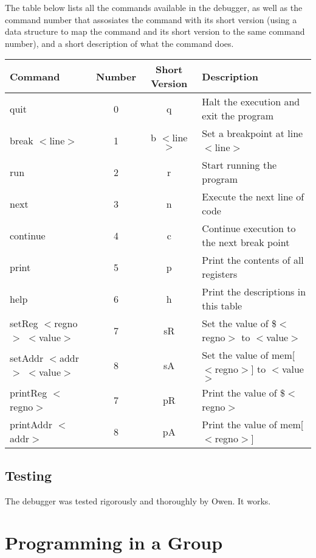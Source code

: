 \documentclass[11pt]{report}
\begin{document}
The table below lists all the commands available in the debugger, as well as the 
command number that assosiates the command with its short version (using a data 
structure to map the command and its short version to the same command number), 
and a short description of what the command does.
\begin{center}
	\begin{tabular}{ | l | c | c | p{5cm} |}
	\hline
	Command & Number & Short Version & Description \\ \hline
	quit & 0 & q & Halt the execution and exit the program \\ \hline
	break $<$line$>$ & 1 & b $<$line$>$ & Set a breakpoint at line $<$line$>$ \\ \hline
	run & 2 & r & Start running the program \\ \hline
	next & 3 & n & Execute the next line of code \\ \hline
	continue & 4 & c & Continue execution to the next break point \\ \hline
	print & 5 & p & Print the contents of all registers \\ \hline
	help & 6 & h & Print the descriptions in this table \\ \hline
	setReg $<$regno$>$ $<$value$>$ & 7 & sR & Set the value of \$$<$regno$>$ to $<$value$>$ \\ \hline
	setAddr $<$addr$>$ $<$value$>$ & 8 & sA & Set the value of mem[$<$regno$>$] to $<$value$>$ \\ \hline
	printReg $<$regno$>$ & 7 & pR & Print the value of \$$<$regno$>$ \\ \hline
	printAddr $<$addr$>$ & 8 & pA & Print the value of mem[$<$regno$>$] \\ \hline
	\end{tabular}
\end{center}

\subsection*{Testing}

The debugger was tested rigorously and thoroughly by Owen. It works.

\section*{Programming in a Group}
\end{document}
